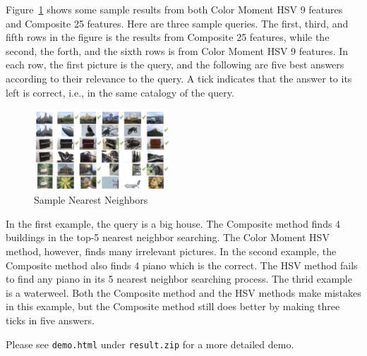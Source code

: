 \documentclass{acm_proc_article-sp}
\begin{document}
Figure~\ref{fig:result} shows some sample results from both
    Color Moment HSV 9 features and
    Composite 25 features.
Here are three sample queries.
The first, third, and fifth rows in the figure
    is the results from Composite 25 features,
    while the second, the forth, and the sixth
    rows is from Color Moment HSV 9 features.
In each row, the first picture is the query,
    and the following are five best answers according to
    their relevance to the query.
A tick indicates that the answer to its left is correct,
    i.e., in the same catalogy of the query.
\begin{figure} \centering
    \includegraphics[width=0.45\textwidth]{data/result.png}
    \caption{Sample Nearest Neighbors}
    \label{fig:result}
\end{figure}

In the first example, the query is a big house.
The Composite method finds 4 buildings in the top-5 nearest neighbor searching.
The Color Moment HSV method, however, finds many
    irrelevant pictures.
In the second example, the Composite method
    also finds 4 piano which is the correct.
The HSV method fails to find any piano in its
    5 nearest neighbor searching process.
The thrid example is a waterweel.
Both the Composite method and the HSV methods make mistakes
    in this example,
    but the Composite method still does better
    by making three ticks in five answers.

Please see \texttt{demo.html} under \texttt{result.zip} for a more detailed demo.
\nocite{*}

 

\balancecolumns
\end{document}
